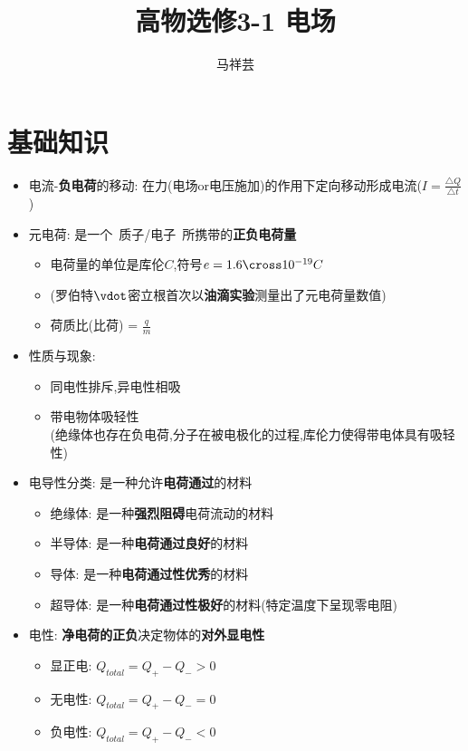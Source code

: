 \documentclass{article}
\title{高物选修3-1 \quad 电场}
\author{马祥芸}
\begin{document}
\maketitle
\tableofcontents
\newpage
{}

\section{基础知识}
\begin{itemize}
    \item 电流-\textbf{负电荷}的移动: 在力(电场or电压施加)的作用下定向移动形成电流($I = \frac{\triangle Q}{\triangle t}$)
    \item 元电荷: 是一个\, 质子/电子\, 所携带的\textbf{正负电荷量}
          \begin{itemize}[label={}]
              \item 电荷量的单位是库伦$C$,符号$e = 1.6 \cross 10^{-19} C$
              \item (罗伯特$\vdot$密立根首次以\textbf{油滴实验}测量出了元电荷量数值)
              \item 荷质比(比荷) = $\frac{q}{m}$
          \end{itemize}

    \item 性质与现象:
          \begin{itemize}
              \item 同电性排斥,异电性相吸
              \item 带电物体吸轻性    \\
                    (绝缘体也存在负电荷,分子在被电极化的过程,库伦力使得带电体具有吸轻性)

          \end{itemize}
    \item 电导性分类: 是一种允许\textbf{电荷通过}的材料

          \begin{itemize}
              \item 绝缘体: 是一种\textbf{强烈阻碍}电荷流动的材料
              \item 半导体: 是一种\textbf{电荷通过良好}的材料
              \item 导体: 是一种\textbf{电荷通过性优秀}的材料
              \item 超导体: 是一种\textbf{电荷通过性极好}的材料(特定温度下呈现零电阻)
          \end{itemize}

    \item 电性: \textbf{净电荷的正负}决定物体的\textbf{对外显电性}

          \begin{itemize}
              \item 显正电: \quad $Q_{total} = Q_{+} - Q_{-} > 0 $
              \item 无电性: \quad $Q_{total} = Q_{+} - Q_{-} = 0 $
              \item 负电性: \quad $Q_{total} = Q_{+} - Q_{-} < 0 $
          \end{itemize}

\end{itemize}
\end{document}
